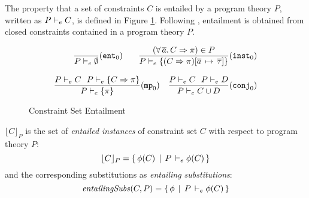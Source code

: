 \vspace*{-.5\baselineskip}
The property that a set of constraints $C$ is entailed by a program
theory $P$, written as $P \vdash_e C$, is defined in Figure
\ref{Entailment-fig}.  Following
\cite{Associated-types-with-class,Associated-type-synonyms},
entailment is obtained from closed constraints contained in a program
theory $P$.


\begin{figure}
   \[ \begin{array}{r}
         \begin{array}{cr}
   		\displaystyle\frac{}{P \vdash_e \emptyset} (\texttt{ent}_0)\hspace*{.3cm} &
		\displaystyle\frac
                        {(\forall\,\overline{a}.\,C\Rightarrow \pi) \in P}
			{P \vdash_e \{ (C\Rightarrow\pi)[\overline{a}\,\mapsto\,\overline{\tau}] \} }
			(\texttt{inst}_0)
         \end{array}\\ \\
         \begin{array}{cr}
		\displaystyle\frac
			{P \vdash_e C \:\:\: P \vdash_e \{C\Rightarrow\pi\} }
			{P \vdash_e \{ \pi \}} (\texttt{mp}_0)
			&
		\displaystyle\frac
			{P \vdash_e C \:\:\: P \vdash_e D}
			{P \vdash_e C \cup D} (\texttt{conj}_0)
	 \end{array}
       \end{array}
   \]
\caption{Constraint Set Entailment}
\label{Entailment-fig}
\end{figure}

\begin{Definition}

  \normalfont
  
$\lfloor C \rfloor_P$ is the set of {\em entailed instances\/} of constraint set
$C$ with respect to program theory $P$:
\[ \lfloor C \rfloor_P = \{\,\phi(C) \,\mid\, P\, \vdash_e \phi(C)\, \} \]
and the corresponding substitutions as {\em entailing substitutions\/}:
  \[ \mathit{entailingSubs\/}(C,P) = \{\,\phi \,\mid\, P\, \vdash_e \phi(C)\, \} \]


\end{Definition}

